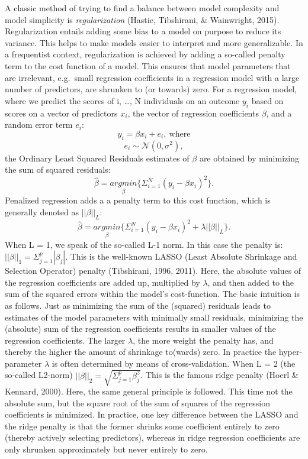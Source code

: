 \documentclass[
  man, donotrepeattitle,floatsintext]{apa6}
\begin{document}
A classic method of trying to find a balance between model complexity and model simplicity is \emph{regularization} (Hastie, Tibshirani, \& Wainwright, 2015). Regularization entails adding some bias to a model on purpose to reduce its variance. This helps to make models easier to interpret and more generalizable. In a frequentist context, regularization is achieved by adding a so-called penalty term to the cost function of a model. This ensures that model parameters that are irrelevant, e.g.~small regression coefficients in a regression model with a large number of predictors, are shrunken to (or towards) zero. For a regression model, where we predict the scores of i, \ldots, N individuals on an outcome \(y_i\) based on scores on a vector of predictors \(x_i\), the vector of regression coefficients \(\beta\), and a random error term \(e_i\):
\[y_i = \beta x_i + e_i, \ \text{where} \]
\[e_i \sim \mathcal{N}(0, \sigma^2), \]
the Ordinary Least Squared Residuals estimates of \(\beta\) are obtained by minimizing the sum of squared residuals:
\[ \hat{\beta} = \underset{\beta}{argmin} \{ \Sigma_{i=1}^N(y_i - \beta x_{i} )^2 \}.\] Penalized regression adds a a penalty term to this cost function, which is generally denoted as \(||\beta||_L\):
\[ \hat{\beta} = \underset{\beta}{argmin} \{ \Sigma_{i=1}^N(y_i - \beta x_{i} )^2 + \lambda ||\beta||_{L} \}.\]
When L = 1, we speak of the so-called L-1 norm. In this case the penalty is: \(||\beta||_1 = \Sigma_{j=1}^p |\beta_j|\). This is the well-known LASSO (Least Absolute Shrinkage and Selection Operator) penalty (Tibshirani, 1996, 2011). Here, the absolute values of the regression coefficients are added up, multiplied by \(\lambda\), and then added to the sum of the squared errors within the model's cost-function. The basic intuition is as follows. Just as minimizing the sum of the (squared) residuals leads to estimates of the model parameters with minimally small residuals, minimizing the (absolute) sum of the regression coefficients results in smaller values of the regression coefficients. The larger \(\lambda\), the more weight the penalty has, and thereby the higher the amount of shrinkage to(wards) zero. In practice the hyper-parameter \(\lambda\) is often determined by means of cross-validation. When L = 2 (the so-called L2-norm) \(||\beta||_2 = \sqrt{\Sigma_{j=1}^p \beta_j^2}\). This is the famous ridge penalty (Hoerl \& Kennard, 2000). Here, the same general principle is followed. This time not the absolute sum, but the square root of the sum of squares of the regression coefficients is minimized. In practice, one key difference between the LASSO and the ridge penalty is that the former shrinks some coefficient entirely to zero (thereby actively selecting predictors), whereas in ridge regression coefficients are only shrunken approximately but never entirely to zero.
\end{document}
